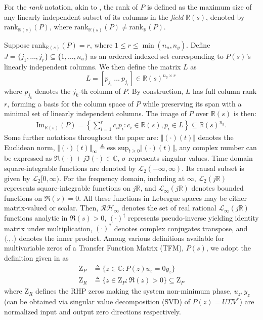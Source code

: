 \documentclass[10pt,a4paper]{amsart}
\theoremstyle{remark}
\begin{document}
For the \textit{rank} notation, akin to \cite{antoniou2005numerical}, the rank of $P$ is defined as the maximum size of any linearly independent subset of its columns in the \textit{field} \(\mathbb{R}(s)\), denoted by \(\text{rank}_{\mathbb{R}(s)}(P)\), where \(\text{rank}_{\mathbb{R}(s)}(P) \ne \text{rank}_{\mathbb{R}}(P) \). 

Suppose $\text{rank}_{\mathbb{R}(s)}(P)=r$, where $1 \leq r \leq \min(n_u,n_y)$. {Define $J=\{j_1,\dots,j_r\} \subseteq \{1,\dots,n_u\}$ as an ordered indexed set corresponding to $P(s)$'s linearly independent columns. We then define the matrix $L$ as 
\begin{equation} \label{eq:Lind_columns_P}
{L} = [ p_{j_i} \ \dots \ p_{j_r} ]\in \mathbb{R}(s)^{n_y \times r} \, 
\end{equation}
where $p_{j_k}$ denotes the $j_k$-th column of $P$. By construction, $L$ has full column rank $r$, forming a basis for the column space of $P$ while preserving its span with a minimal set of linearly independent columns.} The image of $P$ over $\mathbb{R}(s)$ is then:
\small
\begin{align}\label{eq:spanL(P)}
\text{Im}_{\mathbb{R}(s)}(P) = \left\{ \sum_{i=1}^{r} c_i p_i : c_i \in \mathbb{R}(s), p_i \in {L} \right\} \subseteq \mathbb{R}(s)^{n_y}.
\end{align}
\normalsize
Some further notations throughout the paper are: $\Vert (\cdot)(t)\Vert$ denotes the  Euclidean norm, $\Vert (\cdot) (t) \Vert_\infty\triangleq \text{ess sup}_{t \ge 0} \Vert (\cdot)(t)\Vert$, any complex number can be expressed as $\Re(\cdot)\pm j\Im(\cdot) \in \mathbb{C}$, $\sigma$ represents singular values. Time domain square-integrable functions are denoted by $\mathcal{L}_2(-\infty, \infty)$. Its causal subset is given by $\mathcal{L}_2[0, \infty)$. For the frequency domain, including at $\infty$, $\mathcal{L}_2(j\mathbb{R})$ represents square-integrable functions on $j\mathbb{R}$, and $\mathcal{L}_\infty(j\mathbb{R})$ denotes bounded functions on $\Re(s) = 0$. All these functions in Lebesgue spaces may be either matrix-valued or scalar.
Then, $\mathcal{R}\mathcal{H}_\infty$ denotes the set of real rational $\mathcal{L}_\infty(j\mathbb{R})$ functions analytic in $\Re(s) > 0$, $(\cdot)^\dagger$ represents pseudo-inverse yielding identity matrix under multiplication, $(\cdot)^*$ denotes complex conjugates transpose, and $\langle . , . \rangle$ denotes the inner product. Among various definitions available for multivariable zeros of a Transfer Function Matrix (TFM), $P(s)$, we adopt the definition given in \cite[chapter 4.5.3]{skogestad2005multivariable} as
\begin{align} \label{eq:zerosP}
\text{Z}_P &\triangleq \{z \in \mathbb{C} : P(z)u_z=0y_z\} \\
\text{Z}_R &\triangleq  \{z \in \text{Z}_P : \Re(z) > 0\} \subseteq \text{Z}_P  \label{eq:rhpzeros}
\end{align}
where $\text{Z}_R$ defines the RHP zeros making the system non-minimum phase, $u_z,y_z$ (can be obtained via singular value decomposition (SVD) of $P(z)=U\Sigma V^*$) are normalized input and output zero directions respectively.
\end{document}
